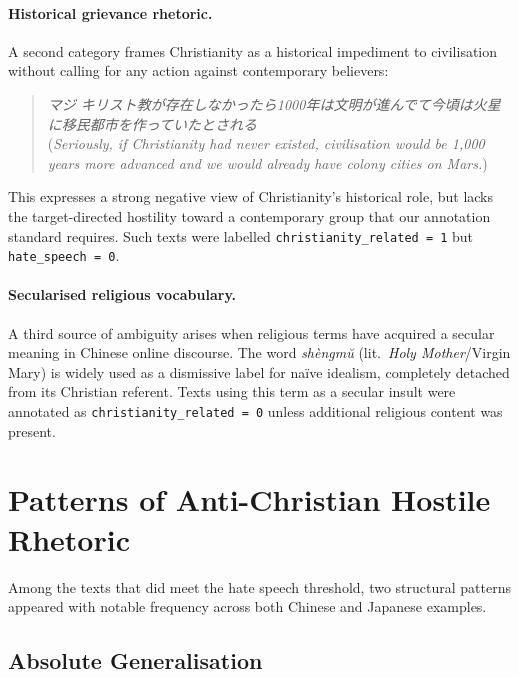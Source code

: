 \documentclass[../CLthesis.tex]{subfiles}
\begin{document}
\paragraph{Historical grievance rhetoric.}
A second category frames Christianity as a historical impediment to civilisation without calling for any action against contemporary believers:

\begin{quote}
\textit{マジ キリスト教が存在しなかったら1000年は文明が進んでて今頃は火星に移民都市を作っていたとされる} \\
(\textit{Seriously, if Christianity had never existed, civilisation would be 1,000 years more advanced and we would already have colony cities on Mars.})
\end{quote}

This expresses a strong negative view of Christianity's historical role, but lacks the target-directed hostility toward a contemporary group that our annotation standard requires. Such texts were labelled \texttt{christianity\_related = 1} but \texttt{hate\_speech = 0}.

\paragraph{Secularised religious vocabulary.}
A third source of ambiguity arises when religious terms have acquired a secular meaning in Chinese online discourse. The word \textit{sh\`engm\u{u}} (lit.\ \textit{Holy Mother}/Virgin Mary) is widely used as a dismissive label for na\"ive idealism, completely detached from its Christian referent. Texts using this term as a secular insult were annotated as \texttt{christianity\_related = 0} unless additional religious content was present.


\section{Patterns of Anti-Christian Hostile Rhetoric}
\label{sec:annotation-patterns}

Among the texts that did meet the hate speech threshold, two structural patterns appeared with notable frequency across both Chinese and Japanese examples.

\subsection{Absolute Generalisation}
\label{subsec:pattern-generalisation}
\end{document}
